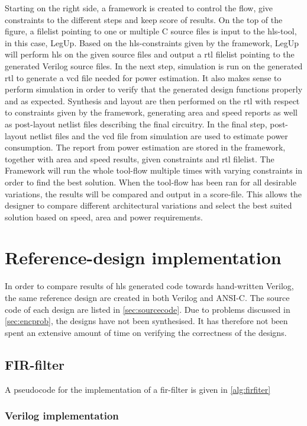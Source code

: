 Starting on the right side, a framework is created to control the flow, give constraints to the different steps and keep score of results. On the top of the figure, a filelist pointing to one or multiple C source files is input to the \gls{hls}-tool, in this case, LegUp. Based on the \gls{hls}-constraints given by the framework, LegUp will perform \gls{hls} on the given source files and output a \gls{rtl} filelist pointing to the generated Verilog source files. In the next step, simulation is run on the generated \gls{rtl} to generate a \gls{vcd} file needed for power estimation. It also makes sense to perform simulation in order to verify that the generated design functions properly and as expected. Synthesis and layout are then performed on the \gls{rtl} with respect to constraints given by the framework, generating area and speed reports as well as post-layout netlist files describing the final circuitry. In the final step, post-layout netlist files and the \gls{vcd} file from simulation are used to estimate power consumption. The report from power estimation are stored in the framework, together with area and speed results, given constraints and \gls{rtl} filelist. The Framework will run the whole tool-flow multiple times with varying constraints in order to find the best solution. When the tool-flow has been ran for all desirable variations, the results will be compared and output in a score-file. This allows the designer to compare different architectural variations and select the best suited solution based on speed, area and power requirements.

\section{Reference-design implementation}
In order to compare results of \gls{hls} generated code towards hand-written Verilog, the same reference design are created in both Verilog and ANSI-C. The source code of each design are listed in \cref{sec:sourcecode}. Due to problems discussed in \cref{sec:encprob}, the designs have not been synthesised. It has therefore not been spent an extensive amount of time on verifying the correctness of the designs.
\subsection{FIR-filter}

A pseudocode for the implementation of a \gls{fir}-filter is given in \cref{alg:firfiter}

\subsubsection{Verilog implementation}

